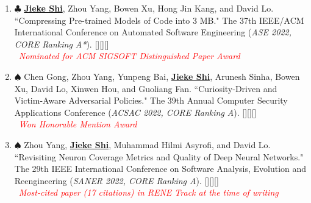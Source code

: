 \documentclass{resume}
\begin{document}
  \begin{enumerate}[itemsep=0.1cm]
    \item[\bracketlabel{C7}] $\clubsuit$ \underline{\bf{Jieke Shi}}, Zhou Yang, Bowen Xu, Hong Jin Kang, and David Lo. ``Compressing Pre-trained Models of Code into 3 MB." {\itfont The 37th IEEE/ACM  International Conference on Automated Software Engineering (}{\it ASE 2022, CORE Ranking A*}{\itfont )}. [][][] \\  \textcolor{red}{\faMedal\ \it{Nominated for ACM SIGSOFT Distinguished Paper Award}}
    
    \item[\bracketlabel{C6}] $\spadesuit$ Chen Gong, Zhou Yang, Yunpeng Bai, \underline{\bf{Jieke Shi}}, Arunesh Sinha, Bowen Xu, David Lo, Xinwen Hou, and Guoliang Fan. ``Curiosity-Driven and Victim-Aware Adversarial Policies." {\itfont The 39th Annual Computer Security Applications Conference (}{\it ACSAC 2022, CORE Ranking A}{\itfont )}. [][][] \\ \textcolor{red}{\faMedal\ \it{Won Honorable Mention Award}}
    
    \item[\bracketlabel{C5}] $\spadesuit$ Zhou Yang, \underline{\bf{Jieke Shi}}, Muhammad Hilmi Asyrofi, and David Lo. ``Revisiting Neuron Coverage Metrics and Quality of Deep Neural Networks." {\itfont The 29th IEEE International Conference on Software Analysis, Evolution and Reengineering (}{\it SANER 2022, CORE Ranking A}{\itfont )}. [][][] \\
    \textcolor{red}{\faFire\ \it{Most-cited paper (17 citations) in RENE Track at the time of writing}} 
  \end{enumerate}

\vspace{-0.2cm}
\end{document}
